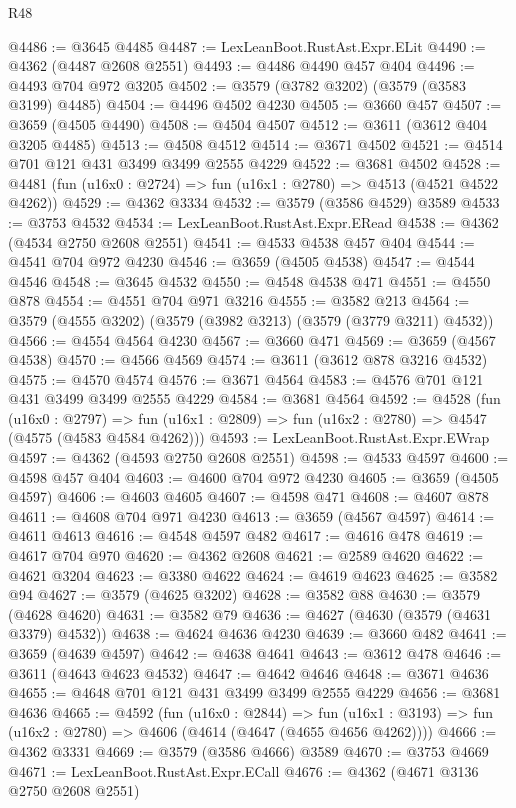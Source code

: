 \begin{lexlean}{R48}
\begin{coremodule}
@4486 := @3645 @4485
@4487 := LexLeanBoot.RustAst.Expr.ELit
@4490 := @4362 (@4487 @2608 @2551)
@4493 := @4486 @4490 @457 @404
@4496 := @4493 @704 @972 @3205
@4502 := @3579 (@3782 @3202) (@3579 (@3583 @3199) @4485)
@4504 := @4496 @4502 @4230
@4505 := @3660 @457
@4507 := @3659 (@4505 @4490)
@4508 := @4504 @4507
@4512 := @3611 (@3612 @404 @3205 @4485)
@4513 := @4508 @4512
@4514 := @3671 @4502
@4521 := @4514 @701 @121 @431 @3499 @3499 @2555 @4229
@4522 := @3681 @4502
@4528 := @4481 (fun (u16x0 : @2724) => fun (u16x1 : @2780) => @4513 (@4521 @4522 @4262))
@4529 := @4362 @3334
@4532 := @3579 (@3586 @4529) @3589
@4533 := @3753 @4532
@4534 := LexLeanBoot.RustAst.Expr.ERead
@4538 := @4362 (@4534 @2750 @2608 @2551)
@4541 := @4533 @4538 @457 @404
@4544 := @4541 @704 @972 @4230
@4546 := @3659 (@4505 @4538)
@4547 := @4544 @4546
@4548 := @3645 @4532
@4550 := @4548 @4538 @471
@4551 := @4550 @878
@4554 := @4551 @704 @971 @3216
@4555 := @3582 @213
@4564 := @3579 (@4555 @3202) (@3579 (@3982 @3213) (@3579 (@3779 @3211) @4532))
@4566 := @4554 @4564 @4230
@4567 := @3660 @471
@4569 := @3659 (@4567 @4538)
@4570 := @4566 @4569
@4574 := @3611 (@3612 @878 @3216 @4532)
@4575 := @4570 @4574
@4576 := @3671 @4564
@4583 := @4576 @701 @121 @431 @3499 @3499 @2555 @4229
@4584 := @3681 @4564
@4592 := @4528
    (fun (u16x0 : @2797) =>
    fun (u16x1 : @2809) => fun (u16x2 : @2780) => @4547 (@4575 (@4583 @4584 @4262)))
@4593 := LexLeanBoot.RustAst.Expr.EWrap
@4597 := @4362 (@4593 @2750 @2608 @2551)
@4598 := @4533 @4597
@4600 := @4598 @457 @404
@4603 := @4600 @704 @972 @4230
@4605 := @3659 (@4505 @4597)
@4606 := @4603 @4605
@4607 := @4598 @471
@4608 := @4607 @878
@4611 := @4608 @704 @971 @4230
@4613 := @3659 (@4567 @4597)
@4614 := @4611 @4613
@4616 := @4548 @4597 @482
@4617 := @4616 @478
@4619 := @4617 @704 @970
@4620 := @4362 @2608
@4621 := @2589 @4620
@4622 := @4621 @3204
@4623 := @3380 @4622
@4624 := @4619 @4623
@4625 := @3582 @94
@4627 := @3579 (@4625 @3202)
@4628 := @3582 @88
@4630 := @3579 (@4628 @4620)
@4631 := @3582 @79
@4636 := @4627 (@4630 (@3579 (@4631 @3379) @4532))
@4638 := @4624 @4636 @4230
@4639 := @3660 @482
@4641 := @3659 (@4639 @4597)
@4642 := @4638 @4641
@4643 := @3612 @478
@4646 := @3611 (@4643 @4623 @4532)
@4647 := @4642 @4646
@4648 := @3671 @4636
@4655 := @4648 @701 @121 @431 @3499 @3499 @2555 @4229
@4656 := @3681 @4636
@4665 := @4592
    (fun (u16x0 : @2844) =>
    fun (u16x1 : @3193) => fun (u16x2 : @2780) => @4606 (@4614 (@4647 (@4655 @4656 @4262))))
@4666 := @4362 @3331
@4669 := @3579 (@3586 @4666) @3589
@4670 := @3753 @4669
@4671 := LexLeanBoot.RustAst.Expr.ECall
@4676 := @4362 (@4671 @3136 @2750 @2608 @2551)

\end{coremodule}
\end{lexlean}
